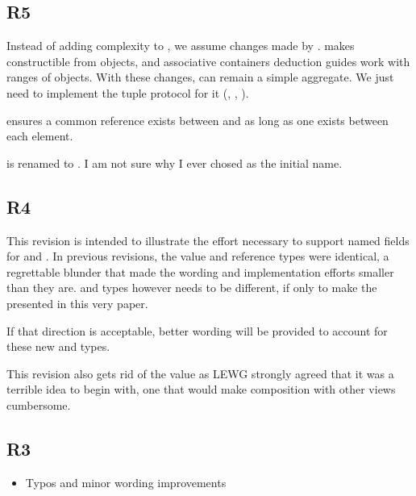\documentclass{wg21}
\begin{document}
\subsection{R5}

Instead of adding complexity to , we assume changes made by .
 makes  constructible from  objects, and associative containers deduction guides work
with ranges of  objects.
With these changes,  can remain a simple aggregate. We just need to implement the tuple protocol for it (, , ).

 ensures a common reference exists between  and  as long as one exists between each element.

 is renamed to . I am not sure why I ever chosed  as the initial name.

\subsection{R4}

This revision is intended to illustrate the effort necessary to support named fields for  and .
In previous revisions, the value and reference types were identical, a regrettable blunder that made the wording and implementation efforts smaller than they are.
 and  types however needs to be different, if only to make the  presented in this very paper.

If that direction is acceptable, better wording will be provided to account for these new  and  types.

This revision also gets rid of the   value as LEWG strongly agreed that it was a terrible idea to begin with, one that would make composition with other views cumbersome.

\subsection{R3}

\begin{itemize}
    \item Typos and minor wording improvements
\end{itemize}
\end{document}
